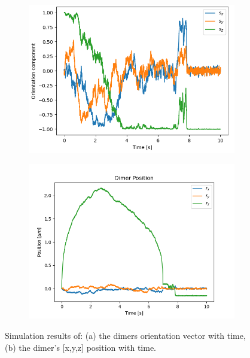 \documentclass[final,  3p]{elsarticle}
\begin{document}
\begin{figure}[h]
	\centering
	\begin{subfigure}{0.45\textwidth}
		\subcaption{}
		\includegraphics[width =\textwidth]{./Images/fig5a.png}
	\end{subfigure}
	\begin{subfigure}{0.45\textwidth}
		\subcaption{}
		\includegraphics[width=\textwidth]{./Images/fig5b.png}
	\end{subfigure}
	\caption{Simulation results of: (a) the dimers orientation vector with time, (b) the dimer's [x,y,z] position with time.}
	\label{fig:motion}
\end{figure}
\end{document}
